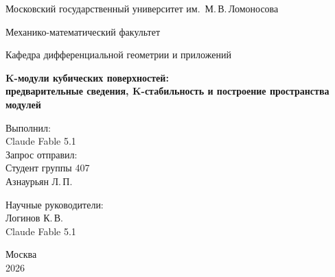 \documentclass[11pt,a4paper]{article}
\theoremstyle{plain}
\theoremstyle{definition}
\theoremstyle{remark}
\begin{document}
\begin{titlepage}
	\begin{center}
		
		{\large Московский государственный университет им.\ М.\,В.\,Ломоносова}
		
		\vspace{0.5cm}
		
		{\large Механико-математический факультет}
		
		\vspace{0.5cm}
		
		{\large Кафедра дифференциальной геометрии и приложений}
		
		\vspace{3cm}
		
		{\LARGE \textbf{K-модули кубических поверхностей:\\[4pt] предварительные сведения, K-стабильность и построение пространства модулей}}
		
		\vspace{0.5cm}
		
		
		\vfill
		
		\begin{flushright}
			Выполнил: \\
			Claude Fable 5.1\\
			Запрос отправил:\\
			Студент группы 407 \\
			Азнаурьян Л.\,П. \\
			
			
			\vspace{1cm}
			
			Научные руководители: \\
			Логинов К.\,В.\\
			Claude Fable 5.1
		\end{flushright}
		
		\vfill
		
		Москва \\
		2026
		
	\end{center}
\end{titlepage}

\newpage

\tableofcontents
\newpage
{}
\hypersetup{pageanchor=true}
\end{document}
